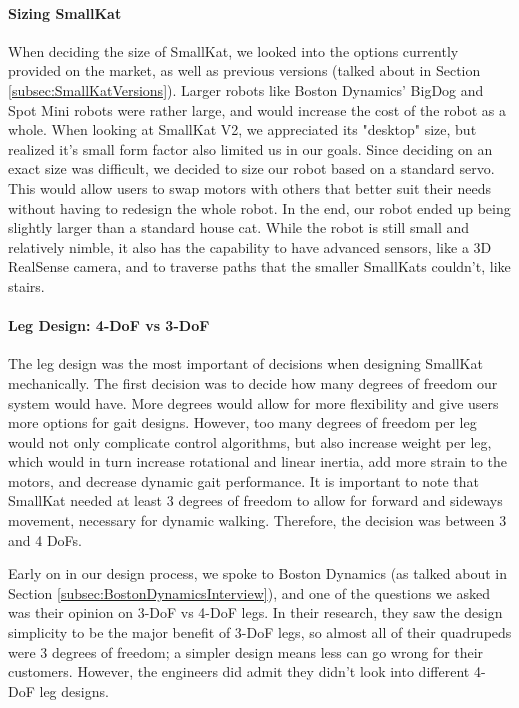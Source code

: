             \paragraph{Sizing SmallKat}
                When deciding the size of SmallKat, we looked into the options currently provided on the market, as well as previous versions (talked about in Section \ref{subsec:SmallKatVersions}). Larger robots like Boston Dynamics' BigDog and Spot Mini robots were rather large, and would increase the cost of the robot as a whole. When looking at SmallKat V2, we appreciated its "desktop" size, but realized it's small form factor also limited us in our goals. Since deciding on an exact size was difficult, we decided to size our robot based on a standard servo. This would allow users to swap motors with others that better suit their needs without having to redesign the whole robot. In the end, our robot ended up being slightly larger than a standard house cat. While the robot is still small and relatively nimble, it also has the capability to have advanced sensors, like a 3D RealSense camera, and to traverse paths that the smaller SmallKats couldn't, like stairs.

            \paragraph{Leg Design: 4-DoF vs 3-DoF}
                The leg design was the most important of decisions when designing SmallKat mechanically. The first decision was to decide how many degrees of freedom our system would have. More degrees would allow for more flexibility and give users more options for gait designs. However, too many degrees of freedom per leg would not only complicate control algorithms, but also increase weight per leg, which would in turn increase rotational and linear inertia, add more strain to the motors, and decrease dynamic gait performance. It is important to note that SmallKat needed at least 3 degrees of freedom to allow for forward and sideways movement, necessary for dynamic walking. Therefore, the decision was between 3 and 4 DoFs.

                Early on in our design process, we spoke to Boston Dynamics (as talked about in Section \ref{subsec:BostonDynamicsInterview}), and one of the questions we asked was their opinion on 3-DoF vs 4-DoF legs. In their research, they saw the design simplicity to be the major benefit of 3-DoF legs, so almost all of their quadrupeds were 3 degrees of freedom; a simpler design means less can go wrong for their customers. However, the engineers did admit they didn't look into different 4-DoF leg designs.

